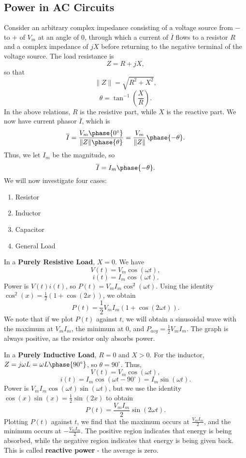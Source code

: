 \documentclass[11pt]{article}
\theoremstyle{plain} %
\theoremstyle{definition}
\theoremstyle{example}
\theoremstyle{remark}
\newcommand{\degree}{^{\circ}}
\begin{document}
\subsection{Power in AC Circuits}
Consider an arbitrary complex impedance consisting of a voltage source from $-$ to $+$ of $V_m$ at an angle of 0, through which a current of $\overline I$ flows to a resistor $R$ and a complex impedance of $jX$ before returning to the negative terminal of the voltage source. The load resistance is $$Z = R+jX,$$ so that $$\|Z\| = \sqrt{R^2+X^2},$$ $$\theta = \tan^{-1}\left(\frac{X}{R}\right).$$ In the above relations, $R$ is the resistive part, while $X$ is the reactive part. We now have current phasor $\overline I$, which is 
$$\overline I = \frac{V_m \phase{0^{\circ}}}{\|Z\|\phase{\theta}} = \frac{V_m}{\|Z\|}\phase{-\theta}.$$
Thus, we let $I_m$ be the magnitude, so 
$$\overline I = I_m\phase{-\theta}.$$
We will now investigate four cases:\begin{enumerate}
	\item Resistor
	\item Inductor
	\item Capacitor
	\item General Load
\end{enumerate}
In a \textbf{Purely Resistive Load}, $X=0$. We have 
$$V(t) = V_m\cos(\omega t),$$
$$i(t) = I_m\cos(\omega t).$$
Power is $V(t)i(t)$, so $P(t) = V_mI_m\cos^2(\omega t)$. Using the identity $\cos^2(x) = \frac{1}{2}\left(1+\cos(2x)\right)$, we obtain 
$$P(t) = \frac{1}{2}V_mI_m\left(1+\cos(2\omega t)\right).$$
We note that if we plot $P(t)$ against $t$, we will obtain a sinusoidal wave with the maximum at $V_mI_m$, the minimum at 0, and $P_{avg} = \frac{1}{2}V_mI_m$. The graph is always positive, as the resistor only absorbs power. 

In a \textbf{Purely Inductive Load}, $R=0$ and $X>0$.
For the inductor, $Z = j\omega L = \omega L\phase{90\degree}$, so $\theta = 90\degree$. 
Thus, 
$$V(t) = V_m\cos(\omega t),$$
$$i(t) = I_m\cos\left(\omega t - 90\degree\right) = I_m\sin(\omega t).$$
Power is $V_mI_m\cos(\omega t)\sin(\omega t)$, but we use the identity $\cos(x)\sin(x) = \frac{1}{2}\sin(2x)$ to obtain 
$$P(t) = \frac{V_mI_m}{2}\sin(2\omega t).$$
Plotting $P(t)$ against $t$, we find that the maximum occurs at $\frac{V_mI_m}{2}$, and the minimum occurs at $-\frac{V_mI_m}{2}$. The positive region indicates that energy is being absorbed, while the negative region indicates that energy is being given back. This is called \textbf{reactive power} - the average is zero. 
\end{document}
